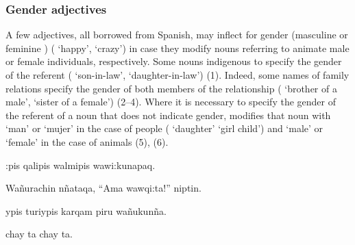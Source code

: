 {\subsubsection{Gender adjectives}
A few adjectives, all borrowed from Spanish, may inflect for gender (masculine  or feminine ) ( `happy',  `crazy') in case they modify nouns referring to animate male or female individuals, respectively. Some nouns indigenous to \SYQ{} specify the gender of the referent ( `son-in-law',  `daughter-in-law') (1). Indeed, some names of family relations specify the gender of both members of the relationship ( `brother of a male',  `sister of a female') (2--4). Where it is necessary to specify the gender of the referent of a noun that does not indicate gender, \SYQ{} modifies that noun with  `man' or  `mujer' in the case of people ( `daughter' \lit{} `girl child') and  `male' or  `female' in the case of animals (5), (6).

%
{:pis qalipis walmipis wawi:kunapaq.}%
{}%
{}{}%

%
{Wa\~nurachin n\~nataqa, ``\textexclamdown{}Ama wawqi:ta!'' niptin.}%
{}%
{}{}%

%
{ypis turiypis karqam piru wa\~nukun\~na.}%
{}%
{}{}%

%
{chay ta chay ta.}%
{}%
{}{}%

}
